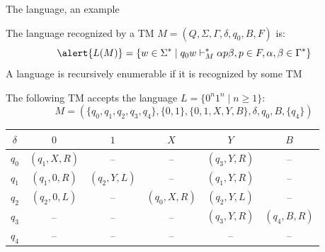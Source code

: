 \documentclass[handout]{beamer}
\begin{document}
\begin{frame}{The language, an example}

    The language \alert{recognized by} a TM $M=(Q,\Sigma, \Gamma, \delta,q_0,B,F)$ is:    
    $$
    \alert{L(M)}=\{w\in \Sigma^*\mid q_0w \vdash_M^* \alpha p \beta, p\in F, \alpha,\beta \in \Gamma^*\}
    $$
    A language is \alert{recursively enumerable} if it is recognized by some TM

    \bigskip

    \begin{example}
        The following TM accepts the language $L=\{0^n1^n\mid n\geq 1\}$:
        $$
        M=(\{q_0,q_1,q_2,q_3,q_4\},\{0,1\},\{0,1,X,Y,B\},\delta,q_0,B,\{q_4\})
        $$

        \vspace{-15pt}
        \begin{center}
            \small
            \begin{tabular}{c | c c c c c}
            $\delta$ & $0$ & $1$ & $X$ & $Y$ & $B$\\
            \hline \hline
            $q_0$ & $(q_1,X,R)$& -- & -- & $(q_3,Y,R)$& --\\
            $q_1$ & $(q_1,0,R)$& $(q_2,Y,L)$& -- & $(q_1,Y,R)$& --\\
            $q_2$ & $(q_2,0,L)$& -- & $(q_0,X,R)$& $(q_2,Y,L)$& --\\
            $q_3$ & -- & -- & -- & $(q_3,Y,R)$& $(q_4,B,R)$\\
            $q_4$ & -- & -- & -- & -- & --
            \end{tabular}
        \end{center}
        \vspace{-9pt}
    \end{example}

\end{frame}
\end{document}
